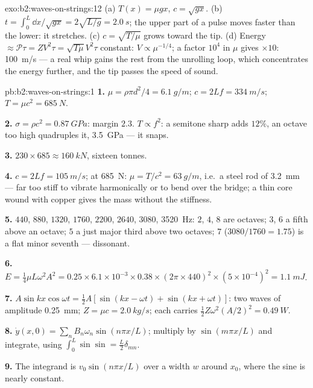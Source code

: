 \begin{solution}{exo:b2:waves-on-strings:12}
(a) $T(x) = \mu gx$, $c = \sqrt{gx}$. (b) $t = \int_0^L\dd x/\sqrt{gx} = 2\sqrt{L/g} =
\qty{2.0}{s}$; the upper part of a pulse moves faster than the lower: it
stretches. (c) $c = \sqrt{T/\mu}$ grows toward the tip. (d) Energy $\approx
\mathcal P\tau = ZV^2\tau = \sqrt{T\mu}V^2\tau$ constant: $V \propto \mu^{-1/4}$; a
factor $10^4$ in $\mu$ gives $\times10$: \qty{100}{m/s} --- a real whip gains
the rest from the unrolling loop, which concentrates the energy
further, and the tip passes the speed of sound.
\end{solution}

\begin{solution}{pb:b2:waves-on-strings:1}
\textbf{1.} $\mu = \rho\pi d^2/4 = \qty{6.1}{g/m}$; $c = 2Lf = \qty{334}{m/s}$; $T = \mu c^2
= \qty{685}{N}$.

\textbf{2.} $\sigma = \rho c^2 = \qty{0.87}{GPa}$: margin $2.3$. $T \propto f^2$: a
semitone sharp adds $12\%$, an octave too high quadruples it,
\qty{3.5}{GPa} --- it snaps.

\textbf{3.} $230 \times 685 \approx \qty{160}{kN}$, sixteen tonnes.

\textbf{4.} $c = 2Lf = \qty{105}{m/s}$; at \qty{685}{N}: $\mu = T/c^2 = \qty{63}{g/m}$,
i.e.\ a steel rod of \qty{3.2}{mm} --- far too stiff to vibrate
harmonically or to bend over the bridge; a thin core wound with copper
gives the mass without the stiffness.

\textbf{5.} $440$, $880$, $1320$, $1760$, $2200$, $2640$, $3080$, \qty{3520}{Hz}: $2$,
$4$, $8$ are octaves; $3$, $6$ a fifth above an octave; $5$ a just major
third above two octaves; $7$ ($3080/1760 = 1.75$) is a flat minor
seventh --- dissonant.

\textbf{6.} $E = \tfrac14\mu L\omega^2A^2 = 0.25 \times 6.1 \times 10^{-3} \times 0.38 \times (2\pi
\times 440)^2 \times (5 \times 10^{-4})^2 = \qty{1.1}{mJ}$.

\textbf{7.} $A\sin kx\cos\omega t = \tfrac12A[\sin(kx - \omega t) + \sin(kx + \omega t)]$: two
waves of amplitude \qty{0.25}{mm}; $Z = \mu c = \qty{2.0}{kg/s}$; each carries
$\tfrac12Z\omega^2(A/2)^2 = \qty{0.49}{W}$.

\textbf{8.} $\dot y(x, 0) = \sum_nB_n\omega_n\sin(n\pi x/L)$; multiply by
$\sin(m\pi x/L)$ and integrate, using $\int_0^L\sin\sin = \tfrac L2\delta_{mn}$.

\textbf{9.} The integrand is $v_0\sin(n\pi x/L)$ over a width $w$ around $x_0$,
where the sine is nearly constant.


\end{solution}
